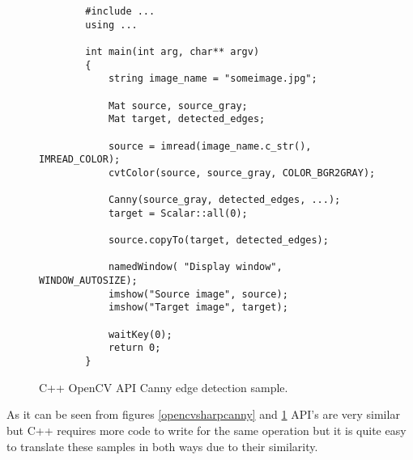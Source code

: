 \documentclass[../../../../main]{subfiles}
\begin{document}
\begin{figure} [!ht]
  \centering    
    \lstset{style=cplusplus}
        \begin{lstlisting}
        #include ...
        using ...
        
        int main(int arg, char** argv)
        {
            string image_name = "someimage.jpg";
        
            Mat source, source_gray;
            Mat target, detected_edges;
            
            source = imread(image_name.c_str(), IMREAD_COLOR);
            cvtColor(source, source_gray, COLOR_BGR2GRAY);
        
            Canny(source_gray, detected_edges, ...);
            target = Scalar::all(0);
        
            source.copyTo(target, detected_edges);
        
            namedWindow( "Display window", WINDOW_AUTOSIZE); 
            imshow("Source image", source);                
            imshow("Target image", target);
        
            waitKey(0);
            return 0;
        }
        \end{lstlisting}
  \caption{C++ OpenCV API Canny edge detection sample.}
  \label{cpluspluscanny}
\end{figure}

As it can be seen from figures \ref{opencvsharpcanny} and \ref{cpluspluscanny} \ac{API}'s are very similar but C++ requires more code to write for the same operation but it is quite easy to translate these samples in both ways due to their similarity.
\end{document}
